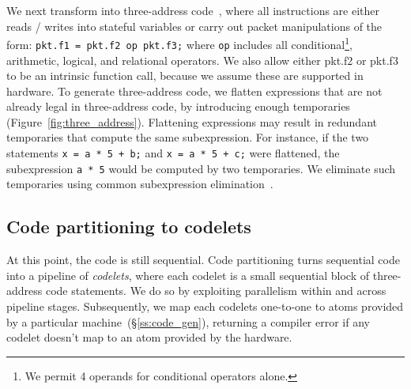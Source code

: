 We next transform into three-address code~\cite{tac}, where all instructions
are either reads / writes into stateful variables or carry out packet
manipulations of the form: \texttt{pkt.f1 = pkt.f2 op pkt.f3;} where
\texttt{op} includes all conditional\footnote{We permit 4 operands for
conditional operators alone.}, arithmetic, logical, and relational operators.
We also allow either pkt.f2 or pkt.f3 to be an intrinsic function call, because
we assume these are supported in hardware. To generate three-address code, we
flatten expressions that are not already legal in three-address code, by
introducing enough temporaries (Figure~\ref{fig:three_address}).  Flattening
expressions may result in redundant temporaries that compute the same
subexpression. For instance, if the two statements \texttt{x = a * 5 + b;} and
\texttt{x = a * 5 + c;} were flattened, the subexpression \texttt{a * 5} would
be computed by two temporaries. We eliminate such temporaries using common
subexpression elimination~\cite{cse}.

\subsection{Code partitioning to codelets}
\label{ss:partitioning}
At this point, the code is still sequential. Code partitioning turns sequential
code into a pipeline of \textit{codelets}, where each codelet is a small
sequential block of three-address code statements. We do so by exploiting
parallelism within and across pipeline stages.  Subsequently, we map each
codelets one-to-one to atoms provided by a particular \absmachine
machine~(\S\ref{ss:code_gen}), returning a compiler error if any codelet
doesn't map to an atom provided by the hardware.

